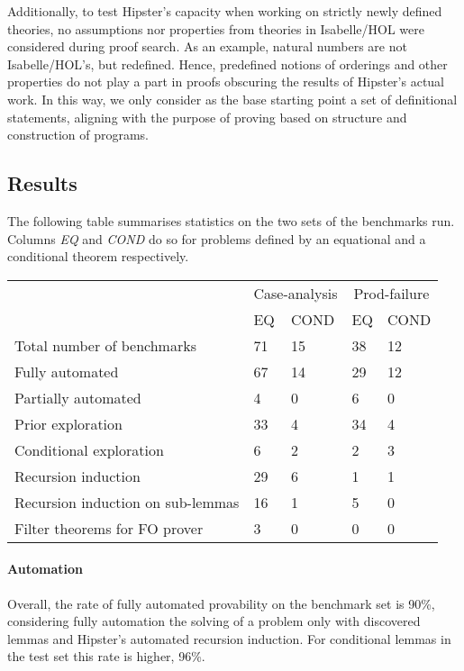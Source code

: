Additionally, to test Hipster's capacity when working on strictly newly defined theories, no assumptions nor properties from theories in Isabelle/HOL were considered during proof search.
%
As an example, natural numbers are not Isabelle/HOL's, but redefined.
%
Hence, predefined notions of orderings and other properties do not play a part in proofs obscuring the results of Hipster's actual work.
%
In this way, we only consider as the base starting point a set of definitional statements, aligning with the purpose of proving based on structure and construction of programs.

\subsection{Results}

The following table summarises statistics on the two sets of the benchmarks run.
%
Columns \emph{EQ} and \emph{COND} do so for problems defined by an equational and a conditional theorem respectively.

\vspace{2 mm}

\noindent \begin{tabularx}{\textwidth}{l | X X | X X}
  & \multicolumn{2}{c|}{Case-analysis} & \multicolumn{2}{c}{Prod-failure} \\
  &  EQ & COND & EQ & COND \\
  \hline
  Total number of benchmarks & 71 & 15 & 38 & 12 \\
  \hline
  Fully automated & 67 & 14 & 29 & 12 \\
  Partially automated & 4 & 0 & 6 & 0 \\
  \hline
  Prior exploration & 33 & 4 & 34 & 4 \\
  Conditional exploration & 6 & 2 & 2 & 3 \\
  \hline
  Recursion induction & 29 & 6 & 1 & 1 \\
  Recursion induction on sub-lemmas & 16 & 1 & 5 & 0 \\
  \hline
  Filter theorems for FO prover & 3 & 0 & 0 & 0 \\ %
\end{tabularx}

\vspace{2 mm}


\paragraph{Automation}
%
Overall, the rate of fully automated provability on the benchmark set is 90\%, considering fully automation the solving of a problem only with discovered lemmas and Hipster's automated recursion induction.
%
For conditional lemmas in the test set this rate is higher, 96\%.

